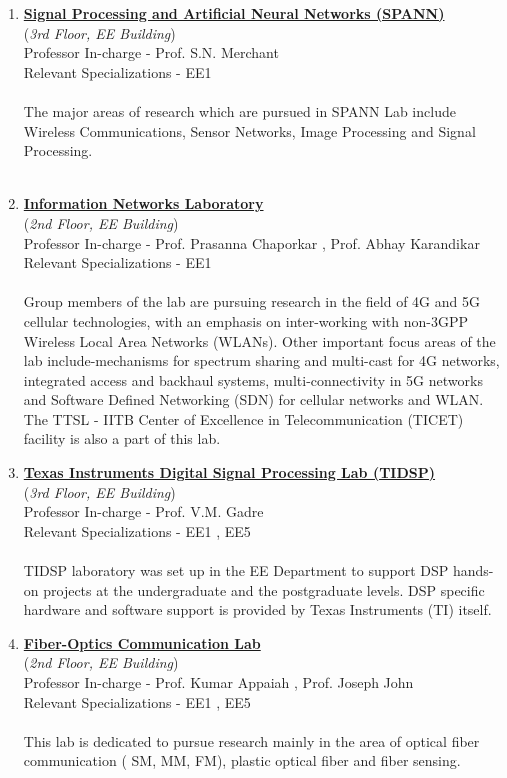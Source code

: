 \documentclass[openany]{book} %
\begin{document}
\begin{enumerate}
\item \href{https://www.ee.iitb.ac.in/~spann/} {\color{blue} \textbf{Signal Processing and Artificial Neural Networks (SPANN)}}\\
    (\textit{3rd Floor, EE Building})\\
    Professor In-charge - Prof. S.N. Merchant\\
Relevant Specializations - EE1\\
\\
The major areas of research which are pursued in SPANN Lab include Wireless Communications, Sensor Networks, Image Processing and Signal Processing.\\
\\
\item \href{https://www.ee.iitb.ac.in/~infonet/} {\color{blue} \textbf{Information Networks Laboratory}}\\
    (\textit{2nd Floor, EE Building})\\
    Professor In-charge - Prof. Prasanna Chaporkar ,  Prof. Abhay Karandikar\\
Relevant Specializations - EE1\\
\\
Group members of the lab are pursuing research in the field of 4G and 5G cellular technologies, with an emphasis on inter-working with non-3GPP Wireless Local Area Networks (WLANs). Other important focus areas of the lab include-mechanisms for spectrum sharing and multi-cast for 4G networks, integrated access and backhaul systems, multi-connectivity in 5G networks and Software Defined Networking (SDN) for cellular networks and WLAN. The TTSL - IITB Center of Excellence in Telecommunication (TICET) facility is also a part of this lab.\\

\item \href{http://www.ee.iitb.ac.in/~tidsplab/index.php} {\color{blue} \textbf{Texas Instruments Digital Signal Processing Lab (TIDSP)}}\\
    (\textit{3rd Floor, EE Building})\\
    Professor In-charge - Prof. V.M. Gadre\\
Relevant Specializations - EE1 , EE5\\
\\
TIDSP laboratory was set up in the EE Department to support DSP hands-on projects at the undergraduate and the postgraduate levels. DSP specific hardware and software support is provided by Texas Instruments (TI) itself.\\
\item \href{https://www.ee.iitb.ac.in/~foclab/} {\color{blue} \textbf{Fiber-Optics Communication Lab}}\\
    (\textit{2nd Floor, EE Building})\\
    Professor In-charge - Prof. Kumar Appaiah , Prof. Joseph John\\
Relevant Specializations - EE1 , EE5\\
\\
This lab is dedicated to pursue research mainly in the area of optical fiber communication ( SM, MM, FM), plastic optical fiber and fiber sensing.\\


\end{enumerate}
\end{document}
